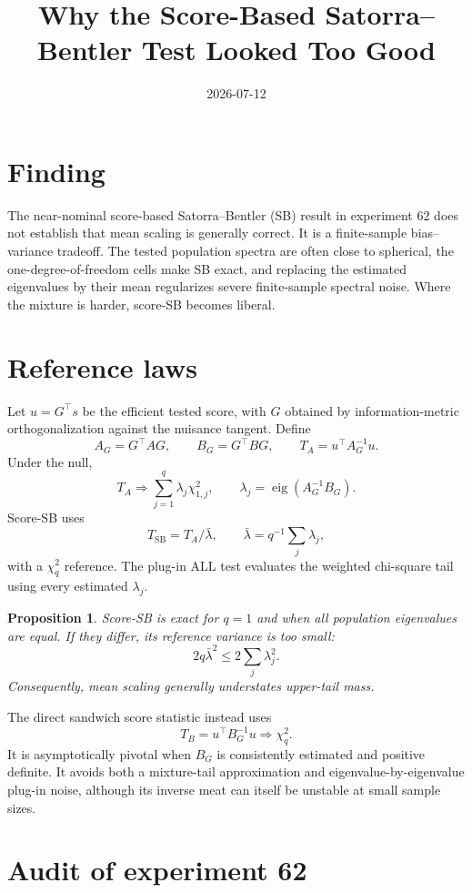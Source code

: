 \documentclass[11pt]{article}
\title{Why the Score-Based Satorra--Bentler Test Looked Too Good}
\author{}
\date{2026-07-12}
\theoremstyle{plain}
\newtheorem{proposition}{Proposition}
\theoremstyle{remark}
\begin{document}
\maketitle

\section*{Finding}

The near-nominal score-based Satorra--Bentler (SB) result in experiment 62
does not establish that mean scaling is generally correct. It is a finite-sample
bias--variance tradeoff. The tested population spectra are often close to
spherical, the one-degree-of-freedom cells make SB exact, and replacing the
estimated eigenvalues by their mean regularizes severe finite-sample spectral
noise. Where the mixture is harder, score-SB becomes liberal.

\section*{Reference laws}

Let $u=G^\top s$ be the efficient tested score, with $G$ obtained by
information-metric orthogonalization against the nuisance tangent. Define
\[
 A_G=G^\top A G,\qquad B_G=G^\top B G,\qquad
 T_A=u^\top A_G^{-1}u.
\]
Under the null,
\[
 T_A \Rightarrow \sum_{j=1}^q \lambda_j\chi^2_{1,j},
 \qquad
 \lambda_j=\operatorname{eig}(A_G^{-1}B_G).
\]
Score-SB uses
\[
 T_{\mathrm{SB}}=T_A/\bar\lambda,
 \qquad \bar\lambda=q^{-1}\sum_j\lambda_j,
\]
with a $\chi_q^2$ reference. The plug-in ALL test evaluates the weighted
chi-square tail using every estimated $\lambda_j$.

\begin{proposition}
Score-SB is exact for $q=1$ and when all population eigenvalues are equal. If
they differ, its reference variance is too small:
\[
 2q\bar\lambda^2 \leq 2\sum_j\lambda_j^2.
\]
Consequently, mean scaling generally understates upper-tail mass.
\end{proposition}

The direct sandwich score statistic instead uses
\[
 T_B=u^\top B_G^{-1}u \Rightarrow \chi_q^2.
\]
It is asymptotically pivotal when $B_G$ is consistently estimated and positive
definite. It avoids both a mixture-tail approximation and eigenvalue-by-eigenvalue
plug-in noise, although its inverse meat can itself be unstable at small sample
sizes.

\section*{Audit of experiment 62}
\end{document}
